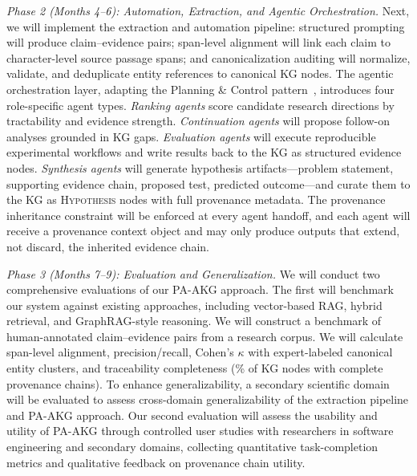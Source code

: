 \documentclass{files/proposalnsf}
\begin{document}
\textit{Phase 2 (Months 4--6): Automation, Extraction, and Agentic Orchestration.}
Next, we will implement the extraction and automation pipeline: structured prompting will produce claim--evidence pairs; span-level alignment will link each claim to character-level source passage spans; and canonicalization auditing will normalize, validate, and deduplicate entity references to canonical KG nodes. The agentic orchestration layer, adapting the Planning \& Control pattern~\cite{Park2023GenerativeAgents}, introduces four role-specific agent types. \textit{Ranking agents} score candidate research directions by tractability and evidence strength. \textit{Continuation agents} will propose follow-on analyses grounded in KG gaps. \textit{Evaluation agents} will execute reproducible experimental workflows and write results back to the KG as structured evidence nodes. \textit{Synthesis agents} will generate hypothesis artifacts---problem statement, supporting evidence chain, proposed test, predicted outcome---and curate them to the KG as \textsc{Hypothesis} nodes with full provenance metadata. The provenance inheritance constraint will be enforced at every agent handoff, and each agent will receive a provenance context object and may only produce outputs that extend, not discard, the inherited evidence chain.

\textit{Phase 3 (Months 7--9): Evaluation and Generalization.}
We will conduct two comprehensive evaluations of our PA-AKG approach. The first will benchmark our system against existing approaches, including vector-based RAG, hybrid retrieval, and GraphRAG-style reasoning. We will construct a benchmark of human-annotated claim--evidence pairs from a research corpus. We will calculate span-level alignment, precision/recall, Cohen's $\kappa$ with expert-labeled canonical entity clusters, and traceability completeness (\ie \% of KG nodes with complete provenance chains). To enhance generalizability, a secondary scientific domain will be evaluated to assess cross-domain generalizability of the extraction pipeline and PA-AKG approach. Our second evaluation will assess the usability and utility of PA-AKG through controlled user studies with researchers in software engineering and secondary domains, collecting quantitative task-completion metrics and qualitative feedback on provenance chain utility.
\end{document}
